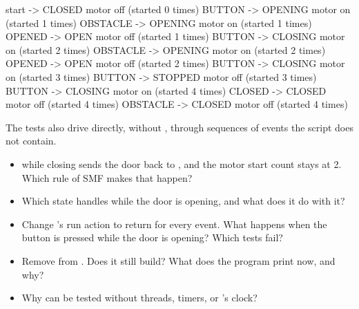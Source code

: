 \begin{console}
start    -> CLOSED  motor off (started 0 times)
BUTTON   -> OPENING motor on  (started 1 times)
OBSTACLE -> OPENING motor on  (started 1 times)
OPENED   -> OPEN    motor off (started 1 times)
BUTTON   -> CLOSING motor on  (started 2 times)
OBSTACLE -> OPENING motor on  (started 2 times)
OPENED   -> OPEN    motor off (started 2 times)
BUTTON   -> CLOSING motor on  (started 3 times)
BUTTON   -> STOPPED motor off (started 3 times)
BUTTON   -> CLOSING motor on  (started 4 times)
CLOSED   -> CLOSED  motor off (started 4 times)
OBSTACLE -> CLOSED  motor off (started 4 times)
\end{console}

\noindent The tests also drive  directly, without , through sequences of
events the script does not contain.

\begin{itemize}
  \item {} while closing sends the door back to , and the motor start count stays
    at 2. Which rule of SMF makes that happen?
  \item Which state handles  while the door is opening, and what does it do with it?
  \item Change ’s run action to return  for every event. What happens
    when the button is pressed while the door is opening? Which tests fail?
  \item Remove  from . Does it still build? What does the
    program print now, and why?
  \item Why can  be tested without threads, timers, or ’s clock?
\end{itemize}
